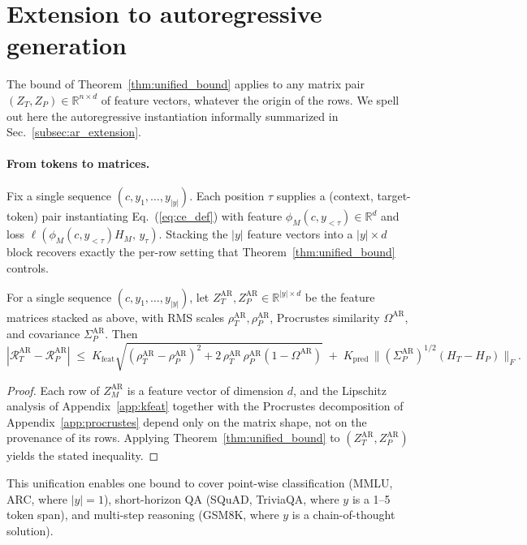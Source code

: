 
\section{Extension to autoregressive generation}
\label{app:ar_extension}

The bound of Theorem~\ref{thm:unified_bound} applies to any matrix pair $(Z_T, Z_P) \in \mathbb{R}^{n \times d}$ of feature vectors, whatever the origin of the rows. We spell out here the autoregressive instantiation informally summarized in Sec.~\ref{subsec:ar_extension}.

\paragraph{From tokens to matrices.}
Fix a single sequence $(c, y_1, \ldots, y_{|y|})$. Each position $\tau$ supplies a (context, target-token) pair instantiating Eq.~(\ref{eq:ce_def}) with feature $\phi_M(c, y_{<\tau}) \in \mathbb{R}^d$ and loss $\ell(\phi_M(c, y_{<\tau}) H_M,\, y_\tau)$. Stacking the $|y|$ feature vectors into a $|y| \times d$ block recovers exactly the per-row setting that Theorem~\ref{thm:unified_bound} controls.

\begin{corollary}
\label{cor:ar_bound}
For a single sequence $(c, y_1, \ldots, y_{|y|})$, let $Z_T^{\mathrm{AR}}, Z_P^{\mathrm{AR}} \in \mathbb{R}^{|y| \times d}$ be the feature matrices stacked as above, with RMS scales $\rho_T^{\mathrm{AR}}, \rho_P^{\mathrm{AR}}$, Procrustes similarity $\Omega^{\mathrm{AR}}$, and covariance $\Sigma_P^{\mathrm{AR}}$. Then
\begin{equation}
\label{eq:ar_bound}
|\mathcal{R}_T^{\mathrm{AR}} - \mathcal{R}_P^{\mathrm{AR}}| \;\le\; K_{\mathrm{feat}} \sqrt{(\rho_T^{\mathrm{AR}} - \rho_P^{\mathrm{AR}})^2 + 2\,\rho_T^{\mathrm{AR}}\,\rho_P^{\mathrm{AR}}(1 - \Omega^{\mathrm{AR}})} \;+\; K_{\mathrm{pred}} \,\big\|(\Sigma_P^{\mathrm{AR}})^{1/2}(H_T - H_P)\big\|_F.
\end{equation}
\end{corollary}

\begin{proof}
Each row of $Z_M^{\mathrm{AR}}$ is a feature vector of dimension $d$, and the Lipschitz analysis of Appendix~\ref{app:kfeat} together with the Procrustes decomposition of Appendix~\ref{app:procrustes} depend only on the matrix shape, not on the provenance of its rows. Applying Theorem~\ref{thm:unified_bound} to $(Z_T^{\mathrm{AR}}, Z_P^{\mathrm{AR}})$ yields the stated inequality.
\end{proof}

This unification enables one bound to cover point-wise classification (MMLU, ARC, where $|y|{=}1$), short-horizon QA (SQuAD, TriviaQA, where $y$ is a 1--5 token span), and multi-step reasoning (GSM8K, where $y$ is a chain-of-thought solution).
